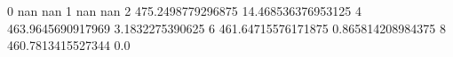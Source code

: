 0 nan nan
1 nan nan
2 475.2498779296875 14.468536376953125
4 463.9645690917969 3.1832275390625
6 461.64715576171875 0.865814208984375
8 460.7813415527344 0.0
